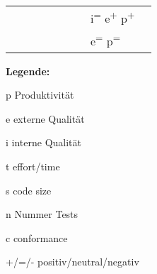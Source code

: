 \begin{table*}[ht]
\begin{threeparttable}
\begin{tabularx}{\textwidth}{@{}lXXXXXXll@{}}
\cite{Causevic2012TestExperiment}        &                                         &                                 &                                                 &                                            &                                           &                                           & i\textsuperscript{=} e\textsuperscript{+} p\textsuperscript{+} &                                                   \\
\cite{Fucci2016AnApproach}               &                                         &                                 &                                                 &                                            &                                           &                                           & e\textsuperscript{=} p\textsuperscript{=}        &                                                   \\ \bottomrule
\end{tabularx}
\medskip
      \footnotesize\textbf{Legende:}\smallskip
      \begin{tablenotes}\footnotesize
      \item[p] Produktivität
      \item[e] externe Qualität
      \item[i] interne Qualität
      \item[t] effort/time
      \item[s] code size
      \item[n] Nummer Tests
      \item[c] conformance
      \item[+/=/-] positiv/neutral/negativ
      \end{tablenotes}
\end{threeparttable}
\end{table*}
